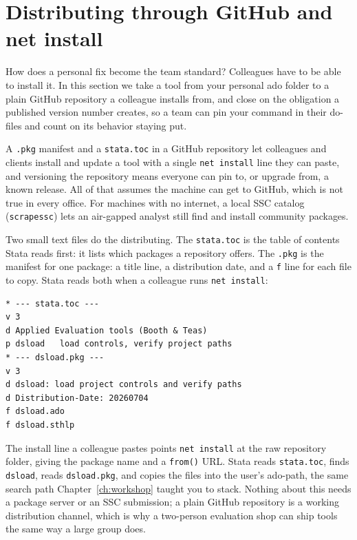 \section{Distributing through GitHub and net install}
How does a personal fix become the team standard? Colleagues have to be able to install it. In this section we take a tool from your personal ado folder to a plain GitHub repository a colleague installs from, and close on the obligation a published version number creates, so a team can pin your command in their do-files and count on its behavior staying put.

A \texttt{.pkg} manifest and a \texttt{stata.toc} in a GitHub repository let colleagues and clients install and update a tool with a single \texttt{net install} line they can paste, and versioning the repository means everyone can pin to, or upgrade from, a known release. All of that assumes the machine can get to GitHub, which is not true in every office. For machines with no internet, a local SSC catalog (\texttt{scrapessc}) lets an air-gapped analyst still find and install community packages.

Two small text files do the distributing. The \texttt{stata.toc} is the table of contents Stata reads first: it lists which packages a repository offers. The \texttt{.pkg} is the manifest for one package: a title line, a distribution date, and a \texttt{f} line for each file to copy. Stata reads both when a colleague runs \texttt{net install}:
\par
{\footnotesize
\begin{verbatim}
* --- stata.toc ---
v 3
d Applied Evaluation tools (Booth & Teas)
p dsload   load controls, verify project paths
* --- dsload.pkg ---
v 3
d dsload: load project controls and verify paths
d Distribution-Date: 20260704
f dsload.ado
f dsload.sthlp
\end{verbatim}
}
The install line a colleague pastes points \texttt{net install} at the raw repository folder, giving the package name and a \texttt{from()} URL. Stata reads \texttt{stata.toc}, finds \texttt{dsload}, reads \texttt{dsload.pkg}, and copies the files into the user's ado-path, the same search path Chapter~\ref{ch:workshop} taught you to stack. Nothing about this needs a package server or an SSC submission; a plain GitHub repository is a working distribution channel, which is why a two-person evaluation shop can ship tools the same way a large group does.

